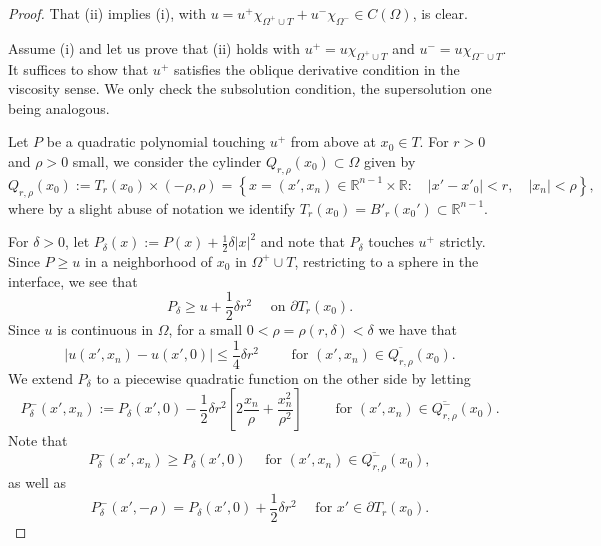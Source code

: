 \documentclass[letter,11pt]{amsart}
\newcommand{\R}{\mathbb{R}}
\newcommand{\chara}[1]{\chi_{#1}}
\theoremstyle{definition}
\numberwithin{equation}{section}
\begin{document}
\begin{proof}
That (ii) implies (i), with $u = u^{+}\chara{\Omega^{+}\cup T} + u^{-}\chara{\Omega^{-}} \in C(\Omega)$, is clear.

\medskip

Assume (i) and let us prove that (ii) holds with $u^{+} = u \chara{\Omega^{+}\cup T}$ and $u^{-} = u \chara{\Omega^{-}\cup T}$.
It suffices to show that $u^{+}$ satisfies the oblique derivative condition in the viscosity sense.
We only check the subsolution condition, the supersolution  one being analogous.

\medskip

Let $P$ be a quadratic polynomial touching $u^{+}$ from above at $x_0 \in T$.
For $r > 0$ and $\rho >0$ small, we consider the cylinder $Q_{r,\rho}(x_0) \subset \Omega$ given by
\[
Q_{r, \rho}(x_0) := 
T_r(x_0) \times (-\rho, \rho) = 
\left\{
x = (x', x_n) \in \R^{n-1} \times \R \colon \quad |x'- x'_0| < r, \quad |x_n| < \rho
\right\},
\]
where by a slight abuse of notation we identify $T_r(x_0) = B'_r(x_0') \subset \R^{n-1}$.

\medskip

For $\delta >0$, let $P_{\delta}(x) := P(x) + \frac{1}{2} \delta |x|^2$ and note that $P_{\delta}$ touches $u^{+}$ strictly.
Since $P \geq u$ in a neighborhood of $x_0$ in $\Omega^{+}\cup T$, restricting to a sphere in the interface, we see that
\begin{equation}
\label{abo1}
P_{\delta} \geq u + \frac{1}{2} \delta r^2 \quad \text{ on } \partial T_r(x_0).
\end{equation}
Since $u$ is continuous in $\Omega$, for a small $0 < \rho = \rho(r, \delta) < \delta$ we have that
\begin{equation}
\label{abo2}
|u(x',x_n) - u(x',0)| \leq \frac{1}{4} \delta r^2 \qquad \text{ for } (x', x_n) \in \overline{Q_{r,\rho}}(x_0).
\end{equation}
We extend $P_{\delta}$ to a piecewise quadratic function on the other side by letting
\[
P_{\delta}^{-}(x', x_n) := P_{\delta}(x',0) - \frac{1}{2} \delta r^2 \left[2 \frac{x_n}{\rho} + \frac{x_n^2}{\rho^2}\right] \qquad \text{ for } (x', x_n) \in \overline{Q_{r, \rho}^{-}}(x_0).
\]
Note that
\begin{equation}
\label{abo3}
P^{-}_{\delta}(x',x_n) \geq P_{\delta}(x',0) \quad \text{ for } (x', x_n) \in \overline{Q_{r, \rho}^{-}}(x_0),
\end{equation}
as well as
\begin{equation}
\label{abo4}
P^{-}_{\delta}(x',- \rho) = P_{\delta}(x',0) + \frac{1}{2} \delta r^2 \quad \text{ for } x' \in \partial T_r(x_0).
\end{equation}


\end{proof}
\end{document}

